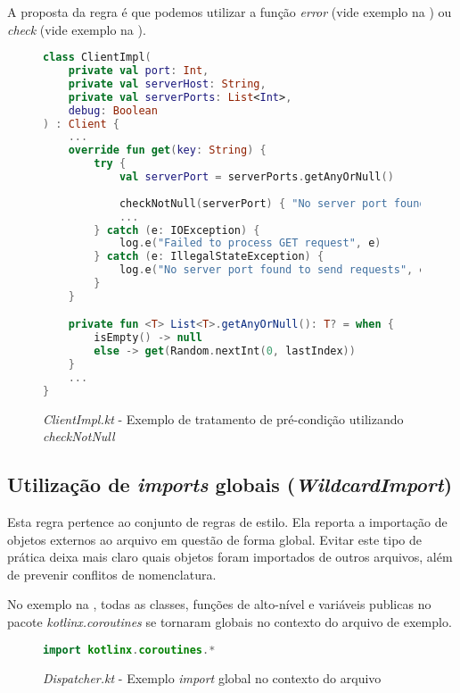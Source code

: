 A proposta da regra é que podemos utilizar a função \textit{error} (vide exemplo na ) ou \textit{check} (vide exemplo na ).

\begin{figure}[H]
    \centering
    \begin{lstlisting}[language=Kotlin]
class ClientImpl(
    private val port: Int,
    private val serverHost: String,
    private val serverPorts: List<Int>,
    debug: Boolean
) : Client {
    ...
    override fun get(key: String) {
        try {
            val serverPort = serverPorts.getAnyOrNull()
            
            checkNotNull(serverPort) { "No server port found to send request" }
            ...
        } catch (e: IOException) {
            log.e("Failed to process GET request", e)
        } catch (e: IllegalStateException) {
            log.e("No server port found to send requests", e)
        }
    }

    private fun <T> List<T>.getAnyOrNull(): T? = when {
        isEmpty() -> null
        else -> get(Random.nextInt(0, lastIndex))
    }
    ...
}
    \end{lstlisting}
    \caption{\textit{ClientImpl.kt} - Exemplo de tratamento de pré-condição utilizando \textit{checkNotNull}}
    \label{fig:detekt_use_error_or_check_after_example}
\end{figure}

\subsection{Utilização de \textit{imports} globais (\textit{WildcardImport})}

Esta regra pertence ao conjunto de regras de estilo. Ela reporta a importação de objetos externos ao arquivo em questão de forma global. Evitar este tipo de prática deixa mais claro quais objetos foram importados de outros arquivos, além de prevenir conflitos de nomenclatura.

No exemplo na , todas as classes, funções de alto-nível e variáveis publicas no pacote \textit{kotlinx.coroutines} se tornaram globais no contexto do arquivo de exemplo.

\begin{figure}[H]
    \centering
    \begin{lstlisting}[language=Kotlin]
import kotlinx.coroutines.*
    \end{lstlisting}
    \caption{\textit{Dispatcher.kt} - Exemplo \textit{import} global no contexto do arquivo}
    \label{fig:detekt_wildcard_imports_before_example}
\end{figure}

